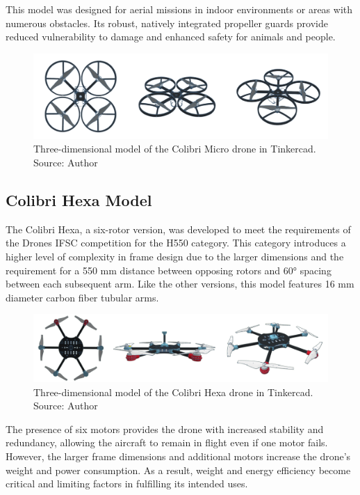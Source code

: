 \documentclass[conference]{IEEEtran}
\begin{document}
This model was designed for aerial missions in indoor environments or areas with numerous obstacles. Its robust, natively integrated propeller guards provide reduced vulnerability to damage and enhanced safety for animals and people.

\begin{figure}[!htb]
    \centering
    \includegraphics[scale=0.12]{img/Colibri-micro.png} 
    \caption{Three-dimensional model of the Colibri Micro drone in Tinkercad. Source: Author}
    \label{fig:my_label}
\end{figure}

\subsection{Colibri Hexa Model}
The Colibri Hexa, a six-rotor version, was developed to meet the requirements of the Drones IFSC competition for the H550 category. This category introduces a higher level of complexity in frame design due to the larger dimensions and the requirement for a 550 mm distance between opposing rotors and 60° spacing between each subsequent arm. Like the other versions, this model features 16 mm diameter carbon fiber tubular arms.

\begin{figure}[!htb]
    \centering
    \includegraphics[scale=0.14]{img/Colibri-hexa.png} 
    \caption{Three-dimensional model of the Colibri Hexa drone in Tinkercad. Source: Author}
    \label{fig:my_label}
\end{figure}

The presence of six motors provides the drone with increased stability and redundancy, allowing the aircraft to remain in flight even if one motor fails. However, the larger frame dimensions and additional motors increase the drone's weight and power consumption. As a result, weight and energy efficiency become critical and limiting factors in fulfilling its intended uses.
\end{document}
